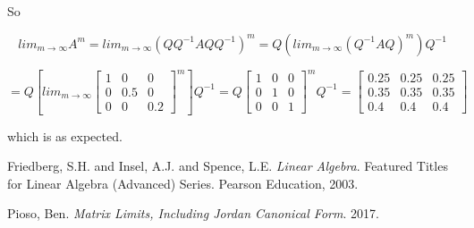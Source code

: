 \documentclass{amsart}
\theoremstyle{definition}
\theoremstyle{remark}
\numberwithin{equation}{section}
\begin{document}
So 

\[  
lim_{m \to \infty}A^m =
lim_{m \to \infty}(QQ^{-1}AQQ^{-1})^m = 
Q(lim_{m \to \infty}(Q^{-1}AQ)^m)Q^{-1} \]

\[
= Q \left[ lim_{m \to \infty} 
\begin{bmatrix}
   1 & 0 & 0  \\
   0 & 0.5 & 0 \\
   0 & 0 & 0.2
 \end{bmatrix}^m \right] Q^{-1}
 =
Q 
\begin{bmatrix}
   1 & 0 & 0  \\
   0 & 1 & 0 \\
   0 & 0 & 1
 \end{bmatrix}^m Q^{-1}
 =
 \begin{bmatrix}{}
0.25 & 0.25 & 0.25 \\
0.35 & 0.35 & 0.35\\
0.4 & 0.4 & 0.4
\end{bmatrix}
\]

which is as expected.




\begin{thebibliography}{9}
 
Friedberg, S.H. and Insel, A.J. and Spence, L.E.
\textit{Linear Algebra}.
Featured Titles for Linear Algebra (Advanced) Series.
Pearson Education,
2003.

Pioso, Ben.
\textit{Matrix Limits, Including Jordan Canonical Form}.
2017.

\end{thebibliography}
\end{document}
